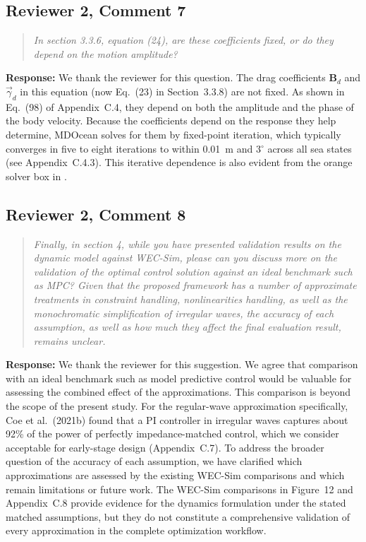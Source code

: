\documentclass[11pt]{article}
\newcommand{\rcomment}[2]{\subsection*{#1}\begin{quote}\itshape #2\end{quote}}
\newcommand{\response}{\noindent\textbf{Response:} }
\begin{document}
\rcomment{Reviewer 2, Comment 7}{In section 3.3.6, equation (24), are these coefficients fixed, or do they depend on the motion amplitude?}
\response We thank the reviewer for this question.
The drag coefficients $\mathbf{B}_d$ and $\vec{\gamma}_d$ in this equation (now Eq.~(23) in Section~3.3.8) are not fixed.
As shown in Eq.~(98) of Appendix~C.4, they depend on both the amplitude and the phase of the body velocity.
Because the coefficients depend on the response they help determine, MDOcean solves for them by fixed-point iteration, which typically converges in five to eight iterations to within 0.01~m and 3$^\circ$ across all sea states (see Appendix~C.4.3).
This iterative dependence is also evident from the orange solver box in .

\rcomment{Reviewer 2, Comment 8}{Finally, in section 4, while you have presented validation results on the dynamic model against WEC-Sim, please can you discuss more on the validation of the optimal control solution against an ideal benchmark such as MPC? Given that the proposed framework has a number of approximate treatments in constraint handling, nonlinearities handling, as well as the monochromatic simplification of irregular waves, the accuracy of each assumption, as well as how much they affect the final evaluation result, remains unclear.}
\response We thank the reviewer for this suggestion. We agree that comparison with an ideal benchmark such as model predictive control would be valuable for assessing the combined effect of the approximations.
This comparison is beyond the scope of the present study.
For the regular-wave approximation specifically, Coe et al.\ (2021b) found that a PI controller in irregular waves captures about 92\% of the power of perfectly impedance-matched control, which we consider acceptable for early-stage design (Appendix~C.7).
To address the broader question of the accuracy of each assumption, we have clarified which approximations are assessed by the existing WEC-Sim comparisons and which remain limitations or future work.
The WEC-Sim comparisons in Figure~12 and Appendix~C.8 provide evidence for the dynamics formulation under the stated matched assumptions, but they do not constitute a comprehensive validation of every approximation in the complete optimization workflow.
\end{document}
